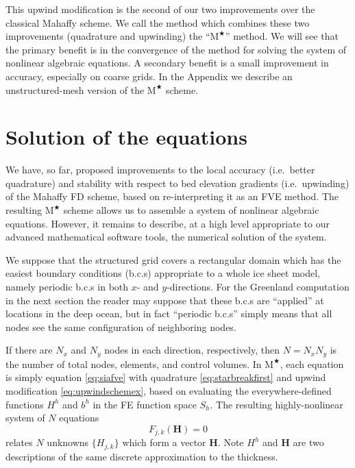 \documentclass[twocolumn,letterpaper]{igs}
\newcommand\bH{\mathbf{H}}
\newcommand{\Mstar}{$\text{M}^{\bigstar}$\xspace}
\begin{document}
This upwind modification is the second of our two improvements over the classical Mahaffy scheme.  We call the method which combines these two improvements (quadrature and upwinding) the ``\Mstar'' method.  We will see that the primary benefit is in the convergence of the method for solving the system of nonlinear algebraic equations.  A secondary benefit is a small improvement in accuracy, especially on coarse grids.  In the Appendix we describe an unstructured-mesh version of the \Mstar scheme.


\section{Solution of the equations} \label{sec:solution}

We have, so far, proposed improvements to the local accuracy (i.e.~better quadrature) and stability with respect to bed elevation gradients (i.e.~upwinding) of the Mahaffy FD scheme, based on re-interpreting it as an FVE method.  The resulting \Mstar scheme allows us to assemble a system of nonlinear algebraic equations.  However, it remains to describe, at a high level appropriate to our advanced mathematical software tools, the numerical solution of the system.

We suppose that the structured grid covers a rectangular domain which has the easiest boundary conditions (b.c.s) appropriate to a whole ice sheet model, namely periodic b.c.s in both $x$- and $y$-directions.  For the Greenland computation in the next section the reader may suppose that these b.c.s are ``applied'' at locations in the deep ocean, but in fact ``periodic b.c.s'' simply means that all nodes see the same configuration of neighboring nodes.

If there are $N_x$ and $N_y$ nodes in each direction, respectively, then $N=N_x N_y$ is the number of total nodes, elements, and control volumes.  In \Mstar, each equation is simply equation \eqref{eq:siafve} with quadrature \eqref{eq:starbreakfirst} and upwind modification \eqref{eq:upwindschemex}, based on evaluating the everywhere-defined functions $H^h$ and $b^h$ in the FE function space $S_h$.  The resulting highly-nonlinear system of $N$ equations
\begin{equation}
F_{j,k}(\bH) = 0   \label{eq:nonlinsystem}
\end{equation}
relates $N$ unknowns $\{H_{j,k}\}$ which form a vector $\bH$.  Note $H^h$ and $\bH$ are two descriptions of the same discrete approximation to the thickness.
\end{document}
